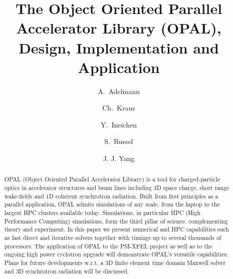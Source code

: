 \documentclass[a4paper,10pt,3p,preprint,pdftex]{elsarticle}
\title{The Object Oriented Parallel Accelerator Library (OPAL), Design, Implementation and Application}
\author[psi]{A.~Adelmann\corref{cor}}
\author[psi]{Ch.~Kraus}
\author[psi]{Y.~Ineichen}
\author[lanl]{S.~Russel}
\author[ciae]{J. J. Yang}
\begin{document}
\begin{keyword}
\end{keyword}

\begin{abstract}
OPAL (Object Oriented Parallel Accelerator Library) is a tool for charged-particle optics in accelerator structures and beam lines including 3D space charge, 
short range wake-fields and 1D coherent synchrotron radiation. Built from first principles as a parallel application, OPAL admits simulations of any scale, 
from the laptop to the largest HPC clusters available today. Simulations, in particular HPC (High Performance Computing) simulations, form the third pillar of science, 
complementing theory and experiment. In this paper we present numerical and HPC capabilities such as fast direct and iterative solvers together with timings up to 
several thousands of processors. The application of OPAL to the PSI-XFEL project as well as to the ongoing high power cyclotron upgrade will demonstrate OPAL's versatile capabilities.
Plans for future developments w.r.t. a 3D finite element time domain Maxwell solver and 3D synchrotron radiation will be discussed.
\end{abstract}

\maketitle
\end{document}
